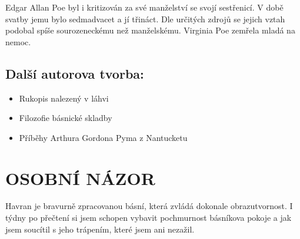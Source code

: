 \documentclass[A4paper]{extarticle} %
\begin{document}
Edgar Allan Poe byl i kritizován za své manželství se svojí sestřenicí. V době svatby jemu bylo sedmadvacet a jí třináct. Dle určitých zdrojů se jejich vztah podobal spíše sourozeneckému než manželskému. Virginia Poe zemřela mladá na nemoc.


\subsection*{Další autorova tvorba:}
\noindent 
\begin{itemize}
    \item Rukopis nalezený v láhvi
    \item Filozofie básnické skladby
    \item Příběhy Arthura Gordona Pyma z Nantucketu
    
\end{itemize}






\section*{OSOBNÍ NÁZOR}
\noindent 
Havran je bravurně zpracovanou básní, která zvládá dokonale obrazutvornost. I týdny po přečtení si jsem schopen vybavit pochmurnost básníkova pokoje a jak jsem soucítil s jeho trápením, které jsem ani nezažil.
\end{document}
